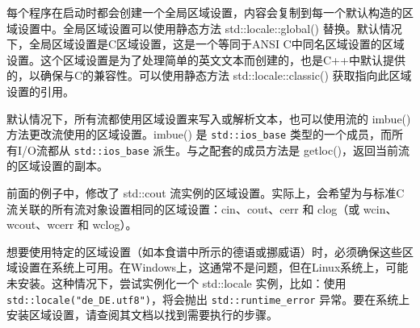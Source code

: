 每个程序在启动时都会创建一个全局区域设置，内容会复制到每一个默认构造的区域设置中。全局区域设置可以使用静态方法 std::locale::global() 替换。默认情况下，全局区域设置是C区域设置，这是一个等同于ANSI C中同名区域设置的区域设置。这个区域设置是为了处理简单的英文文本而创建的，也是C++中默认提供的，以确保与C的兼容性。可以使用静态方法 std::locale::classic() 获取指向此区域设置的引用。

默认情况下，所有流都使用区域设置来写入或解析文本，也可以使用流的 imbue() 方法更改流使用的区域设置。imbue() 是 \verb|std::ios_base| 类型的一个成员，而所有I/O流都从 \verb|std::ios_base| 派生。与之配套的成员方法是 getloc()，返回当前流的区域设置的副本。

\begin{myTip}
前面的例子中，修改了 std::cout 流实例的区域设置。实际上，会希望为与标准C流关联的所有流对象设置相同的区域设置：cin、cout、cerr 和 clog（或 wcin、wcout、wcerr 和 wclog）。
\end{myTip}

想要使用特定的区域设置（如本食谱中所示的德语或挪威语）时，必须确保这些区域设置在系统上可用。在Windows上，这通常不是问题，但在Linux系统上，可能未安装。这种情况下，尝试实例化一个 std::locale 实例，比如：使用 \verb|std::locale("de_DE.utf8")|，将会抛出 \verb|std::runtime_error| 异常。要在系统上安装区域设置，请查阅其文档以找到需要执行的步骤。





